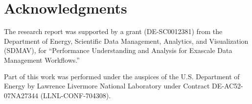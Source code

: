 \section{Acknowledgments}

The research report was supported by a grant (DE-SC0012381) from the
Department of Energy, Scientific Data Management, Analytics, and
Visualization (SDMAV), for ``Performance Understanding and Analysis
for Exascale Data Management Workflows.''

Part of this work was performed under the auspices of the
U.S. Department of Energy by Lawrence Livermore National Laboratory
under Contract DE-AC52-07NA27344 (LLNL-CONF-704308).




